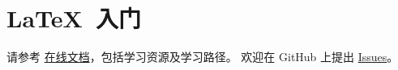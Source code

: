 \section{\LaTeX\ 入门}
请参考 \href{https://tex.readthedocs.io/zh_CN/latest/}{在线文档}，包括学习资源及学习路径。
欢迎在 GitHub 上提出 \href{https://github.com/Iydon/tex/issues}{Issues}。
